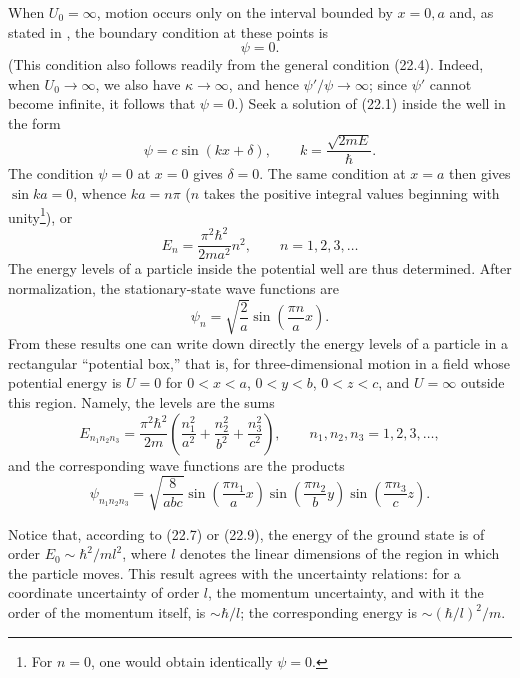 When $U_0=\infty$, motion occurs only on the interval bounded by $x=0,a$ and,
as stated in , the boundary condition at these points is
\begin{equation}
  \psi=0.
  \tag{22.5}
\end{equation}
(This condition also follows readily from the general condition (22.4).
Indeed, when $U_0\to\infty$, we also have $\kappa\to\infty$, and hence
$\psi'/\psi\to\infty$; since $\psi'$ cannot become infinite, it follows that
$\psi=0$.) Seek a solution of (22.1) inside the well in the form
\begin{equation}
  \psi=c\sin(kx+\delta),
  \qquad k=\frac{\sqrt{2mE}}{\hbar}.
  \tag{22.6}
\end{equation}
The condition $\psi=0$ at $x=0$ gives $\delta=0$. The same condition at $x=a$
then gives $\sin ka=0$, whence $ka=n\pi$ ($n$ takes the positive integral
values beginning with unity\footnote{For $n=0$, one would obtain identically
$\psi=0$.}), or
\begin{equation}
  E_n=\frac{\pi^2\hbar^2}{2ma^2}n^2,
  \qquad n=1,2,3,\ldots
  \tag{22.7}
\end{equation}
The energy levels of a particle inside the potential well are thus determined. After
normalization, the stationary-state wave functions are
\begin{equation}
  \psi_n=\sqrt{\frac{2}{a}}\sin\left(\frac{\pi n}{a}x\right).
  \tag{22.8}
\end{equation}
From these results one can write down directly the energy levels of a particle
in a rectangular ``potential box,'' that is, for three-dimensional motion in
a field whose potential energy is $U=0$ for $0<x<a$, $0<y<b$, $0<z<c$, and
$U=\infty$ outside this region. Namely, the levels are the sums
\begin{equation}
  E_{n_1n_2n_3}=\frac{\pi^2\hbar^2}{2m}
  \left(\frac{n_1^2}{a^2}+\frac{n_2^2}{b^2}+\frac{n_3^2}{c^2}\right),
  \qquad n_1,n_2,n_3=1,2,3,\ldots,
  \tag{22.9}
\end{equation}
and the corresponding wave functions are the products
\begin{equation}
  \psi_{n_1n_2n_3}=\sqrt{\frac{8}{abc}}
  \sin\left(\frac{\pi n_1}{a}x\right)
  \sin\left(\frac{\pi n_2}{b}y\right)
  \sin\left(\frac{\pi n_3}{c}z\right).
  \tag{22.10}
\end{equation}

Notice that, according to (22.7) or (22.9), the energy of the ground state is
of order $E_0\sim\hbar^2/ml^2$, where $l$ denotes the linear dimensions of
the region in which the particle moves. This result agrees with the
uncertainty relations: for a coordinate uncertainty of order $l$, the
momentum uncertainty, and with it the order of the momentum itself, is
$\sim\hbar/l$; the corresponding energy is
$\sim{\left(\hbar/l\right)}^2/m$.

